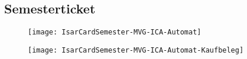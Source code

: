


\subsection{Semesterticket}

\begin{figure}[ht]
	\centering
	\begin{minipage}[b]{0.45\linewidth}
		\texttt{[image: IsarCardSemester-MVG-ICA-Automat]}
		\label{fig:isarcardsemestermvg}
	\end{minipage}
	\quad
	\begin{minipage}[b]{0.45\linewidth}
		\texttt{[image: IsarCardSemester-MVG-ICA-Automat-Kaufbeleg]}
		\label{fig:isarcardsemesterbelegmvg}
	\end{minipage}
\end{figure}

